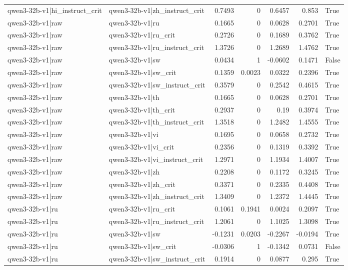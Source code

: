 \begin{table}
\begin{tabular}{l l r r r r l}
qwen3-32b-v1|hi_instruct_crit & qwen3-32b-v1|zh_instruct_crit & 0.7493 & 0 & 0.6457 & 0.853 & True \\
qwen3-32b-v1|raw & qwen3-32b-v1|ru & 0.1665 & 0 & 0.0628 & 0.2701 & True \\
qwen3-32b-v1|raw & qwen3-32b-v1|ru_crit & 0.2726 & 0 & 0.1689 & 0.3762 & True \\
qwen3-32b-v1|raw & qwen3-32b-v1|ru_instruct_crit & 1.3726 & 0 & 1.2689 & 1.4762 & True \\
qwen3-32b-v1|raw & qwen3-32b-v1|sw & 0.0434 & 1 & -0.0602 & 0.1471 & False \\
qwen3-32b-v1|raw & qwen3-32b-v1|sw_crit & 0.1359 & 0.0023 & 0.0322 & 0.2396 & True \\
qwen3-32b-v1|raw & qwen3-32b-v1|sw_instruct_crit & 0.3579 & 0 & 0.2542 & 0.4615 & True \\
qwen3-32b-v1|raw & qwen3-32b-v1|th & 0.1665 & 0 & 0.0628 & 0.2701 & True \\
qwen3-32b-v1|raw & qwen3-32b-v1|th_crit & 0.2937 & 0 & 0.19 & 0.3974 & True \\
qwen3-32b-v1|raw & qwen3-32b-v1|th_instruct_crit & 1.3518 & 0 & 1.2482 & 1.4555 & True \\
qwen3-32b-v1|raw & qwen3-32b-v1|vi & 0.1695 & 0 & 0.0658 & 0.2732 & True \\
qwen3-32b-v1|raw & qwen3-32b-v1|vi_crit & 0.2356 & 0 & 0.1319 & 0.3392 & True \\
qwen3-32b-v1|raw & qwen3-32b-v1|vi_instruct_crit & 1.2971 & 0 & 1.1934 & 1.4007 & True \\
qwen3-32b-v1|raw & qwen3-32b-v1|zh & 0.2208 & 0 & 0.1172 & 0.3245 & True \\
qwen3-32b-v1|raw & qwen3-32b-v1|zh_crit & 0.3371 & 0 & 0.2335 & 0.4408 & True \\
qwen3-32b-v1|raw & qwen3-32b-v1|zh_instruct_crit & 1.3409 & 0 & 1.2372 & 1.4445 & True \\
qwen3-32b-v1|ru & qwen3-32b-v1|ru_crit & 0.1061 & 0.1941 & 0.0024 & 0.2097 & True \\
qwen3-32b-v1|ru & qwen3-32b-v1|ru_instruct_crit & 1.2061 & 0 & 1.1025 & 1.3098 & True \\
qwen3-32b-v1|ru & qwen3-32b-v1|sw & -0.1231 & 0.0203 & -0.2267 & -0.0194 & True \\
qwen3-32b-v1|ru & qwen3-32b-v1|sw_crit & -0.0306 & 1 & -0.1342 & 0.0731 & False \\
qwen3-32b-v1|ru & qwen3-32b-v1|sw_instruct_crit & 0.1914 & 0 & 0.0877 & 0.295 & True \\

\end{tabular}
\end{table}

